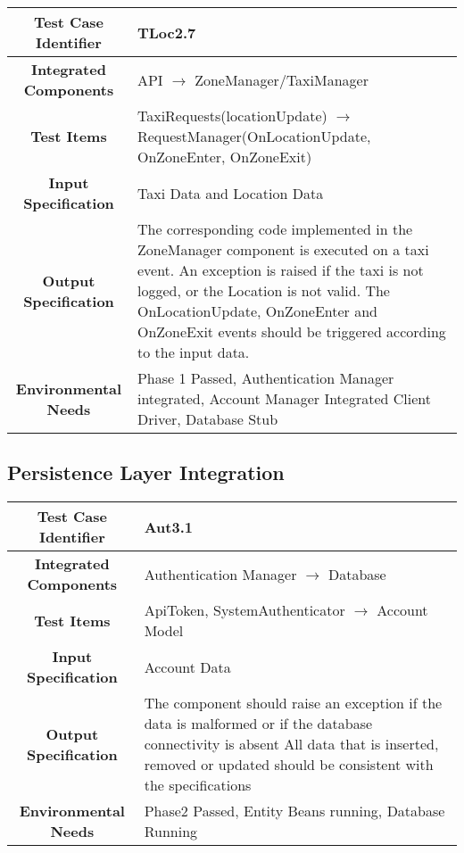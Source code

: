 \documentclass[11pt, a4paper,titlepage]{article}
\begin{document}
	 \begin{tabularx}{\textwidth}{| c|X|}
	 	\hline \textbf{Test Case Identifier} & TLoc2.7\\
	 	\hline \textbf{Integrated Components} & API  $\rightarrow $  ZoneManager/TaxiManager \\
	 	\hline \textbf{Test Items} & TaxiRequests(locationUpdate) $\rightarrow $ RequestManager(OnLocationUpdate, OnZoneEnter, OnZoneExit) \\
	 	\hline \textbf{Input Specification} & Taxi Data and Location Data \\
	 	\hline \textbf{Output Specification} & The corresponding code implemented in the ZoneManager component is executed on a taxi event. 
	 	\newline An exception is raised if the taxi is not logged, or the Location is not valid. \newline
	 	The OnLocationUpdate, OnZoneEnter and OnZoneExit events should be triggered according to the input data. \\
	 	\hline \textbf{Environmental Needs} &  Phase 1 Passed, Authentication Manager integrated, Account Manager Integrated \newline 
	 	Client Driver, Database Stub\\
	 	\hline
	 \end{tabularx}
	 \newline
	 	
	\subsection{Persistence Layer Integration}
	
		\begin{tabularx}{\textwidth}{| c|X|}
			\hline \textbf{Test Case Identifier} & Aut3.1 \\
			\hline \textbf{Integrated Components} & Authentication Manager $\rightarrow $ Database \\
			\hline \textbf{Test Items} & ApiToken, SystemAuthenticator $\rightarrow $ Account Model \\
			\hline \textbf{Input Specification} & Account Data \\
			\hline \textbf{Output Specification} & The component should raise an exception if the data is malformed or if the database connectivity is absent \newline
			All data that is inserted, removed or updated should be consistent with the specifications\\
			\hline \textbf{Environmental Needs} & Phase2 Passed, Entity Beans running, Database Running \\
			\hline
		\end{tabularx}
		\newline
	
\end{document}
